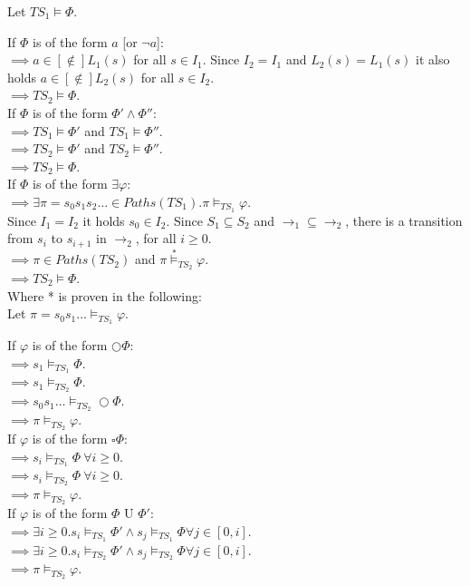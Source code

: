 \documentclass[11pt]{article}
\begin{document}
Let $TS_1 \models \Phi$.

If $\Phi$ is of the form $a$ [or $\lnot a$]:\\
$\implies a \in [\notin] L_1(s)$ for all $s \in I_1$. Since $I_2 = I_1$ and $L_2(s) = L_1(s)$ it also holds $a \in [\notin] L_2(s)$ for all $s \in I_2$.\\
$\implies TS_2 \models \Phi$.\\

If $\Phi$ is of the form $\Phi' \land \Phi''$:\\
$\implies TS_1 \models \Phi'$ and $TS_1 \models \Phi''$.\\
$\implies TS_2 \models \Phi'$ and $TS_2 \models \Phi''$.\\
$\implies TS_2 \models \Phi$.\\

If $\Phi$ is of the form $\exists \varphi$:\\
$\implies \exists \pi = s_0 s_1 s_2 \ldots \in Paths(TS_1) . \pi \models_{TS_1} \varphi$.\\
Since $I_1 = I_2$ it holds $s_0 \in I_2$. Since $S_1 \subseteq S_2$ and $\rightarrow_1 \subseteq \rightarrow_2$, there is a transition from $s_i$ to $s_{i+1}$ in $\rightarrow_2$, for all $i \ge 0$.\\
$\implies \pi \in Paths(TS_2)$ and $\pi \stackrel{*}{\models}_{TS_2} \varphi$.\\
$\implies TS_2 \models \Phi$.\\

Where * is proven in the following:\\
Let $\pi = s_0 s_1 \ldots \models_{TS_1} \varphi$.

If $\varphi$ is of the form $\bigcirc \Phi$:\\
$\implies s_1 \models_{TS_1} \Phi$.\\
$\implies s_1 \models_{TS_2} \Phi$.\\
$\implies s_0 s_1 \ldots \models_{TS_2} \bigcirc \Phi$.\\
$\implies \pi \models_{TS_2} \varphi$.\\

If $\varphi$ is of the form $\square \Phi$:\\
$\implies s_i \models_{TS_1} \Phi \ \forall i \ge 0$.\\
$\implies s_i \models_{TS_2} \Phi \ \forall i \ge 0$.\\
$\implies \pi \models_{TS_2} \varphi$.\\

If $\varphi$ is of the form $\Phi \text{ U } \Phi'$:\\
$\implies \exists i \ge 0 . s_i \models_{TS_1} \Phi' \land s_j \models_{TS_1} \Phi \forall j \in [0,i]$.\\
$\implies \exists i \ge 0 . s_i \models_{TS_2} \Phi' \land s_j \models_{TS_2} \Phi \forall j \in [0,i]$.\\
$\implies \pi \models_{TS_2} \varphi$.\\
\end{document}
